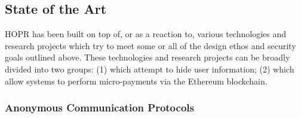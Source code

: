 \subsection{State of the Art}
\label{sec:stateoftheart}

HOPR has been built on top of, or as a reaction to, various technologies and research projects which try to meet some or all of the design ethos and security goals outlined above. These technologies and research projects can be broadly divided into two groups: (1)  which attempt
to hide user information; (2)  which allow systems
to perform micro-payments via the Ethereum blockchain.

\subsubsection{Anonymous Communication Protocols}
\label{sec:privacyprotocols}

